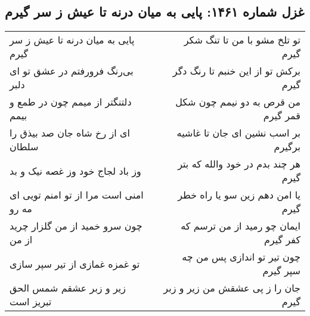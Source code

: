 \begin{center}
\section*{غزل شماره ۱۴۶۱: پایی به میان درنه تا عیش ز سر گیرم}
\label{sec:1461}
\begin{longtable}{l p{0.5cm} r}
پایی به میان درنه تا عیش ز سر گیرم
&&
تو تلخ مشو با من تا تنگ شکر گیرم
\\
بی‌رنگ فرورفتم در عشق تو ای دلبر
&&
برکش تو از این خنبم تا رنگ دگر گیرم
\\
دلتنگتر از میمم چون در طمع و بیمم
&&
من قرص به دو نیمم چون شکل قمر گیرم
\\
ای از رخ شاه جان صد بیذق را سلطان
&&
بر اسب نشین ای جان تا غاشیه برگیرم
\\
وز باد لجاج خود وز غصه نیک و بد
&&
هر چند بدم در خود والله که بتر گیرم
\\
امنی است مرا از تو امنم تویی ای مه رو
&&
یا امن دهم زین سو یا راه خطر گیرم
\\
چون سرو خمید از من گلزار چرید از من
&&
ایمان چو رمید از من ترسم که کفر گیرم
\\
تو غمزه غمازی از تیر سپر سازی
&&
چون تیر تو اندازی پس من چه سپر گیرم
\\
زیر و زبر عشقم شمس الحق تبریز است
&&
جان را ز پی عشقش من زیر و زبر گیرم
\\
\end{longtable}
\end{center}
